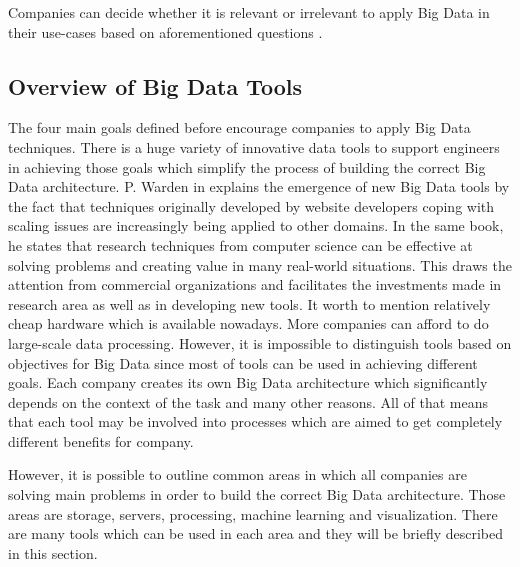 \documentclass[runningheads]{llncs}
\begin{document}
Companies can decide whether it is relevant or irrelevant to apply Big Data in their use-cases based on aforementioned questions .
\subsection{Overview of Big Data Tools}

The four main goals defined before encourage companies to apply Big Data techniques. There is a huge variety of innovative data tools to support engineers in achieving those goals which simplify the process of building the correct Big Data architecture. P. Warden in \cite{GLOSSARY} explains the emergence of new Big Data tools by the fact that techniques originally developed by website developers coping with scaling issues are increasingly being applied to other domains. In the same book, he states that research techniques from computer science can be effective at solving problems and creating value in many real-world situations. This draws the attention from commercial organizations and facilitates the investments made in research area as well as in developing new tools. It worth to mention relatively cheap hardware which is available nowadays. More companies can afford to do large-scale data processing. However, it is impossible to distinguish tools based on objectives for Big Data since most of tools can be used in achieving different goals. Each company creates its own Big Data architecture which significantly depends on the context of the task and many other reasons. All of that means that each tool may be involved into processes which are aimed to get completely different benefits for company.   

However, it is possible to outline common areas in which all companies are solving main problems in order to build the correct Big Data architecture. Those areas are storage, servers, processing, machine learning and visualization. There are many tools which can be used in each area and they will be briefly described in this section. 
\end{document}
